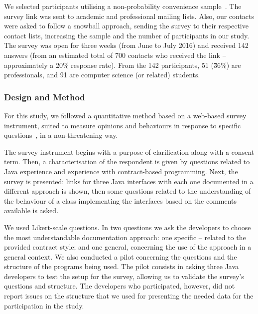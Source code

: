 We selected participants utilising a non-probability convenience sample~\cite{wohlin}. 
The survey link was sent to academic and professional mailing lists.
Also, our contacts were asked to follow a snowball approach, sending the survey to their respective
contact lists, increasing the sample and the number of participants in our study.
The survey was open for three weeks (from June to July 2016) and received 142
answers (from an estimated total of 700 contacts who received the link -- approximately a 20\% response
rate). From the 142 participants, 51 (\~36\%) are professionals, and 91 are computer science (or related) students.


\subsubsection{Design and Method}
\label{sec:surveyDes}

For this study, we followed a quantitative method based on a web-based survey instrument, suited to measure opinions and behaviours in response to specific questions~\cite{refSurvey}, in a non-threatening way. 

The survey
instrument
begins with a purpose of clarification along with a consent term.
Then, a characterisation of the respondent is given by questions related to Java experience and experience with contract-based programming. Next, the survey is presented: links for three Java interfaces with each one documented in a different approach is shown, then some questions related to the understanding of the behaviour of a class implementing the interfaces based on the comments available is asked. 

We used Likert-scale questions. In two questions we ask the developers to choose the most understandable documentation approach: one specific -- related to the provided contract style; and one general, concerning the use of the approach in a general context.
We also conducted a pilot concerning the questions and the structure of the programs being used. The pilot consists in asking three Java
developers to test the setup for the survey, allowing us to validate the survey's questions and structure. The developers who participated, however, did not report issues on the structure that we used for presenting the needed data for the participation in the study.

